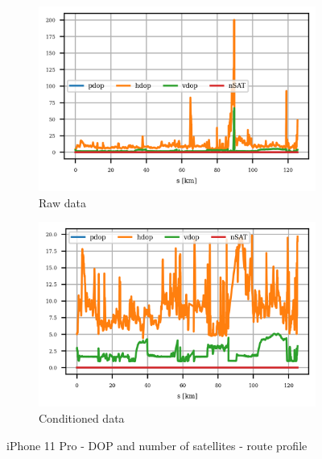 \documentclass{article}
\begin{document}
			\begin{figure}[h]
		   		\centering
		     	\begin{subfigure}[b]{0.45\textwidth}
		      		\centering
		      	   \includegraphics[width=\textwidth]{Route/raw_dop_IPhone 11 Pro.png}
		      	   \caption{Raw data}
		      	   \label{fig:iPhone_raw_dop}
		     	\end{subfigure}
		     	\begin{subfigure}[b]{0.45\textwidth}
		      	   \centering
		      	   \includegraphics[width=\textwidth]{Route/cond_dop_IPhone 11 Pro.png}
		      	   \caption{Conditioned data}
		      	   \label{fig:iPhone_cond_dop}
		     	\end{subfigure}
		      \caption{iPhone 11 Pro - DOP and number of satellites - route profile}
		      \label{fig:iPhone_dop}
			\end{figure}
\end{document}
